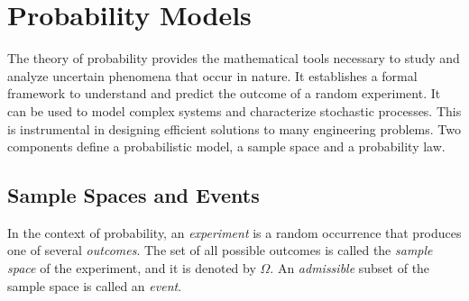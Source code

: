 \chapter{Probability Models}

The theory of probability provides the mathematical tools necessary to study and analyze uncertain phenomena that occur in nature.
It establishes a formal framework to understand and predict the outcome of a random experiment.
It can be used to model complex systems and characterize stochastic processes.
This is instrumental in designing efficient solutions to many engineering problems.
Two components define a probabilistic model, a sample space and a probability law.


\section{Sample Spaces and Events}

In the context of probability, an \emph{experiment} is a random occurrence that produces one of several \emph{outcomes}.
The set of all possible outcomes is called the \emph{sample space} of the experiment, and it is denoted by $\Omega$.
An \emph{admissible} subset of the sample space is called an \emph{event}.

